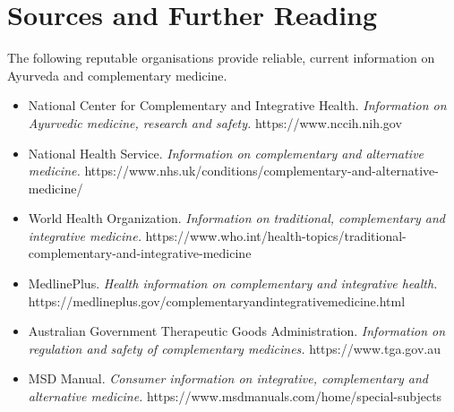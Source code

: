 \section*{Sources and Further Reading}
The following reputable organisations provide reliable, current information on Ayurveda and complementary medicine.

\begin{itemize}
    \item National Center for Complementary and Integrative Health. \textit{Information on Ayurvedic medicine, research and safety.} https://www.nccih.nih.gov
    \item National Health Service. \textit{Information on complementary and alternative medicine.} https://www.nhs.uk/conditions/complementary-and-alternative-medicine/
    \item World Health Organization. \textit{Information on traditional, complementary and integrative medicine.} https://www.who.int/health-topics/traditional-complementary-and-integrative-medicine
    \item MedlinePlus. \textit{Health information on complementary and integrative health.} https://medlineplus.gov/complementaryandintegrativemedicine.html
    \item Australian Government Therapeutic Goods Administration. \textit{Information on regulation and safety of complementary medicines.} https://www.tga.gov.au
    \item MSD Manual. \textit{Consumer information on integrative, complementary and alternative medicine.} https://www.msdmanuals.com/home/special-subjects
\end{itemize}
